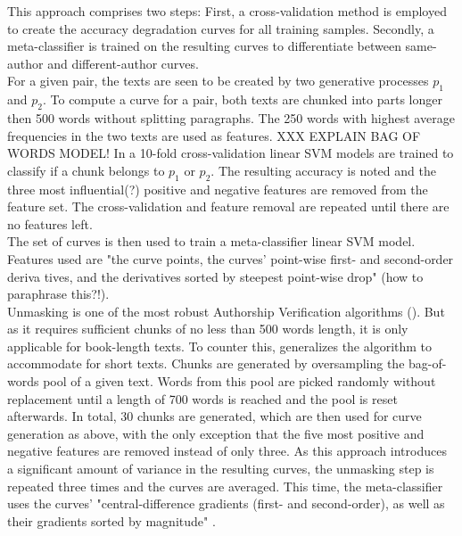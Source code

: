 This approach comprises two steps: First, a cross-validation method is employed to create the accuracy degradation curves for all training samples.
Secondly, a meta-classifier is trained on the resulting curves to differentiate between same-author and different-author curves.\\
For a given pair, the texts are seen to be created by two generative processes $p_1$ and $p_2$.
To compute a curve for a pair, both texts are chunked into parts longer then 500 words without splitting paragraphs.
The 250 words with highest average frequencies in the two texts are used as features.
XXX EXPLAIN BAG OF WORDS MODEL!
In a 10-fold cross-validation linear SVM models are trained to classify if a chunk belongs to $p_1$ or $p_2$.
The resulting accuracy is noted and the three most influential(?) positive and negative features are removed from the feature set.
The cross-validation and feature removal are repeated until there are no features left.\\
The set of curves is then used to train a meta-classifier linear SVM model.
Features used are "the curve points, the curves' point-wise first- and second-order deriva
tives, and the derivatives sorted by steepest point-wise drop" \cite{bevendorff2019unmaskingShortTexts}(how to paraphrase this?!).\\
Unmasking is one of the most robust Authorship Verification algorithms (\cite{bevendorff2019unmaskingShortTexts}).
But as it requires sufficient chunks of no less than 500 words length, it is only applicable for book-length texts.
To counter this, \cite{bevendorff2019unmaskingShortTexts} generalizes the algorithm to accommodate for short texts.
Chunks are generated by oversampling the bag-of-words pool of a given text.
Words from this pool are picked randomly without replacement until a length of 700 words is reached and the pool is reset afterwards.
In total, 30 chunks are generated, which are then used for curve generation as above, with the only exception that the five most positive and negative features are removed instead of only three.
As this approach introduces a significant amount of variance in the resulting curves, the unmasking step is repeated three times and the curves are averaged.
This time, the meta-classifier uses the curves' "central-difference gradients (first- and second-order), as well as their gradients sorted by magnitude" \cite{bevendorff2019unmaskingShortTexts}.
